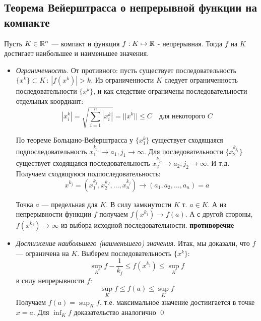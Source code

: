 \documentclass[a4paper]{article}
\begin{document}
\subsection{Теорема Вейерштрасса о непрерывной функции на компакте}
\theorem Пусть $K\in \operatorname{\mathbb{R}}^n$ — компакт и функция $f: K\mapsto \operatorname{\mathbb{R}}$ - непрерывная. Тогда $f$ на $K$ достигает наибольшее и наименьшее значения.

\proof 
\begin{itemize}
    \item \textit{Ограниченность.} От противного: пусть существует последовательность $\{x^k\} \subset K \,:\, |f(x^k)| > k$. Из ограниченности $K$ следует ограниченность последовательности $\{x^k\}$, и как следствие ограничены последовательности отдельных коордиант:
    \begin{equation*}
        |x_i^k| = \sqrt{\sum_{i=1}^n|x_i^k|} = ||x^k|| \le C \quad \text{для некоторого }C
    \end{equation*}

    По теореме Больцано-Вейерштрасса у $\{x_1^k\}$ существует сходящаяся подпоследовательность $x_1^{k_{j_1}} \to a_1, j_1 \to \infty$. Для последовательности $\{x_2^{k_{j_1}}\}$ существует сходящаяся последовательность $x_2^{k_{j_2}} \to a_2, j_2 \to \infty$. И т.д. Получаем сходящуюся подпоследовательность:
    \begin{equation*}
        x^{k_j} = (x_1^{k_j}, x_2^{k_J}, \ldots, x_n^{k_j})\to(a_1, a_2, \ldots, a_n) = a
    \end{equation*}

    Точка $a$ — предельная для $K$. В силу замкнутости $K$ т. $a\in K$. А из непрерывности функции $f$ получаем $f(x^{k_j}) \to f(a)$. А с другой стороны, $f(x^{k_j})\to\infty$ из выбора исходной последовательности. \textbf{противоречие}

    \item \textit{Достижение наибольшего (наименьшего) значения.} Итак, мы доказали, что $f$ — ограничена на $K$. Выберем последовательность $\{x^k\}$:
    \begin{equation*}
        \sup_K f - \frac{1}{k_j} \le f(x^{k_j}) \le \sup_K f
    \end{equation*}
    в силу непрерывности $f$:
    \begin{equation*}
        \sup_K f \le f(a) \le \sup_K f
    \end{equation*}
    Получаем $f(a) = \displaystyle\sup_K f$, т.е. максимальное значение достиигается в точке $x = a$. Для $\displaystyle\inf_K f$ доказательство аналогично
    \qed
\end{itemize}
\end{document}
